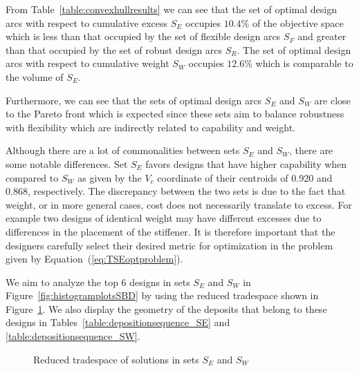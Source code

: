 From Table~\ref{table:convexhullresults} we can see that the set of optimal design arcs with respect to cumulative excess $S_E$ occupies $10.4\%$ of the objective space which is less than that occupied by the set of flexible design arcs $S_F$ and greater than that occupied by the set of robust design arcs $S_R$. The set of optimal design arcs with respect to cumulative weight $S_W$ occupies $12.6\%$ which is comparable to the volume of $S_E$.

Furthermore, we can see that the sets of optimal design arcs $S_E$ and $S_W$ are close to the Pareto front which is expected since these sets aim to balance robustness with flexibility which are indirectly related to capability and weight.

Although there are a lot of commonalities between sets $S_E$ and $S_W$, there are some notable differences. Set $S_E$ favors designs that have higher capability when compared to $S_W$ as given by the $V_c$ coordinate of their centroids of 0.920 and 0.868, respectively. The discrepancy between the two sets is due to the fact that weight, or in more general cases, cost does not necessarily translate to excess. For example two designs of identical weight may have different excesses due to differences in the placement of the stiffener. It is therefore important that the designers carefully select their desired metric for optimization in the problem given by Equation~(\ref{eq:TSEoptproblem}).

We aim to analyze the top 6 designs in sets $S_E$ and $S_W$ in Figure~\ref{fig:histogramplotsSBD} by using the reduced tradespace shown in Figure~\ref{fig:reducedTSE}. We also display the geometry of the deposits that belong to these designs in Tables~\ref{table:depositionsequence_SE} and \ref{table:depositionsequence_SW}.

\begin{figure}[h!]
	\centering
	\caption{Reduced tradespace of solutions in sets $S_E$ and $S_W$}
	\label{fig:reducedTSE}
\end{figure}

